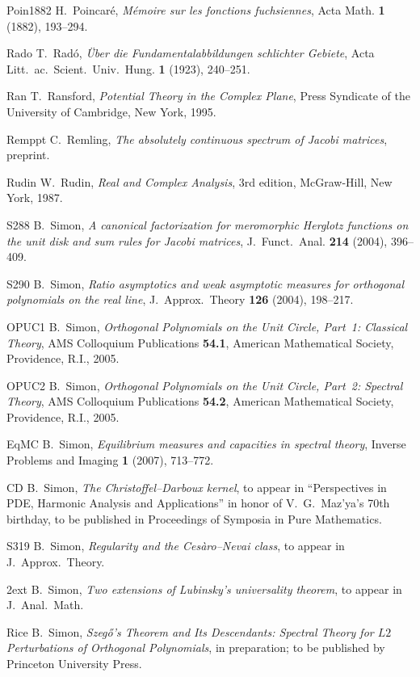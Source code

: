 \documentclass[reqno,centertags, 12pt]{amsart}
\numberwithin{equation}{section}
\theoremstyle{definition}
\begin{document}
\begin{thebibliography}{999}
{\bibitem}{Poin1882} H.~Poincar\'e, {\it M\'emoire sur les fonctions
fuchsiennes}, Acta Math. {\bf 1} (1882), 193--294.

{\bibitem}{Rado} T.~Rad\'o, \textit{\"Uber die Fundamentalabbildungen
schlichter Gebiete}, Acta Litt.\ ac.\ Scient.\ Univ.\ Hung. {\bf 1}
(1923), 240--251.

{\bibitem}{Ran} T.~Ransford, \textit{Potential Theory in the Complex
Plane}, Press Syndicate of the University of Cambridge, New York,
1995.

{\bibitem}{Remppt} C.~Remling, \emph{The absolutely continuous spectrum of
Jacobi matrices}, preprint.

{\bibitem}{Rudin} W.~Rudin, \textit{Real and Complex Analysis}, 3rd
edition, McGraw-Hill, New York, 1987.

{\bibitem}{S288} B.~Simon, {\it A canonical factorization for meromorphic
Herglotz functions on the unit disk and sum rules for Jacobi
matrices}, J.\ Funct.\ Anal. {\bf 214} (2004), 396--409.

{\bibitem}{S290} B.~Simon, {\it Ratio asymptotics and weak asymptotic
measures for orthogonal polynomials on the real line}, J.\ Approx.\
Theory {\bf 126} (2004), 198--217.

{\bibitem}{OPUC1} B.~Simon, \textit{Orthogonal Polynomials on the Unit
Circle, Part~1: Classical Theory}, AMS Colloquium Publications {\bf
54.1}, American Mathematical Society, Providence, R.I., 2005.

{\bibitem}{OPUC2} B.~Simon, \textit{Orthogonal Polynomials on the Unit
Circle, Part~2: Spectral Theory}, AMS Colloquium Publications {\bf
54.2}, American Mathematical Society, Providence, R.I., 2005.

{\bibitem}{EqMC} B.~Simon, \emph{Equilibrium measures and capacities in
spectral theory}, Inverse Problems and Imaging {\bf 1} (2007),
713--772.

{\bibitem}{CD} B.~Simon, {\it The Christoffel--Darboux kernel}, to appear
in ``Perspectives in PDE, Harmonic Analysis and Applications'' in
honor of V.~G.~Maz'ya's 70th birthday, to be published in
Proceedings of Symposia in Pure Mathematics.

{\bibitem}{S319} B.~Simon, {\it Regularity and the Ces\`aro--Nevai class},
to appear in J.\ Approx.\ Theory.

{\bibitem}{2ext} B.~Simon, {\it Two extensions of Lubinsky's universality
theorem}, to appear in J.\ Anal.\ Math.

{\bibitem}{Rice} B.~Simon, \textit{Szeg\H{o}'s Theorem and Its Descendants:
Spectral Theory for $L2$ Perturbations of Orthogonal Polynomials},
in preparation; to be published by Princeton University Press.


\end{thebibliography}
\end{document}
